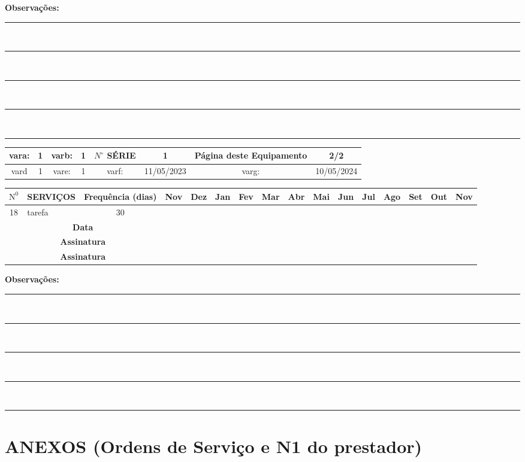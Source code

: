 \documentclass[a4paper, 12pt]{article}
\begin{document}
\footnotesize\textbf{Observações:}\\[0.1cm]
\noindent\rule{\textwidth}{0.2mm} \\[0.1cm]
\noindent\rule{\textwidth}{0.2mm} \\[0.1cm]
\noindent\rule{\textwidth}{0.2mm} \\[0.1cm]
\noindent\rule{\textwidth}{0.2mm} \\[0.1cm]
\noindent\rule{\textwidth}{0.2mm}




\newpage
\begin{adjustbox}{width=18cm ,center}
\begin{tabular}{|c|c|c|c|c|c|c|c|}
\hline vara: & 1 & varb: & 1 & $N^{\circ}$ SÉRIE & 1 & \textbf{Página deste Equipamento} & \textbf{2/2} \\
\hline vard & 1 & vare: & 1 & varf: & 11/05/2023 & varg: & 10/05/2024 \\
\hline
\end{tabular}
\end{adjustbox}

\begin{adjustbox}{width=18cm ,center}
\begin{tabular}{|c|p{12cm}|c|c|c|c|c|c|c|c|c|c|c|c|c|c|}
\hline $\mathrm{N}^0$ & SERVIÇOS & Frequência (dias) & Nov & Dez & Jan & Fev & Mar & Abr & Mai & Jun & Jul & Ago & Set & Out & Nov \\
\hline 18 & tarefa & 30 & & & & & & & & & & & & & \\
\hline
\multicolumn{3}{|c|}{\textbf{Data }} &  & & & & & & & &  &  & &  &  \\
\hline \multicolumn{3}{|c|}{\textbf{Assinatura }} &  & & & & & & & & & &   &  &  \\
\hline \multicolumn{3}{|c|}{\textbf{Assinatura }} &  & & & & & & & & & &   &  &  \\
\hline
\end{tabular}
\end{adjustbox}


\footnotesize\textbf{Observações:}\\[0.1cm]
\noindent\rule{\textwidth}{0.2mm} \\[0.1cm]
\noindent\rule{\textwidth}{0.2mm} \\[0.1cm]
\noindent\rule{\textwidth}{0.2mm} \\[0.1cm]
\noindent\rule{\textwidth}{0.2mm} \\[0.1cm]
\noindent\rule{\textwidth}{0.2mm}
\newpage
\newpage
\section{ANEXOS (Ordens de Serviço e N1 do prestador)}
\end{document}
